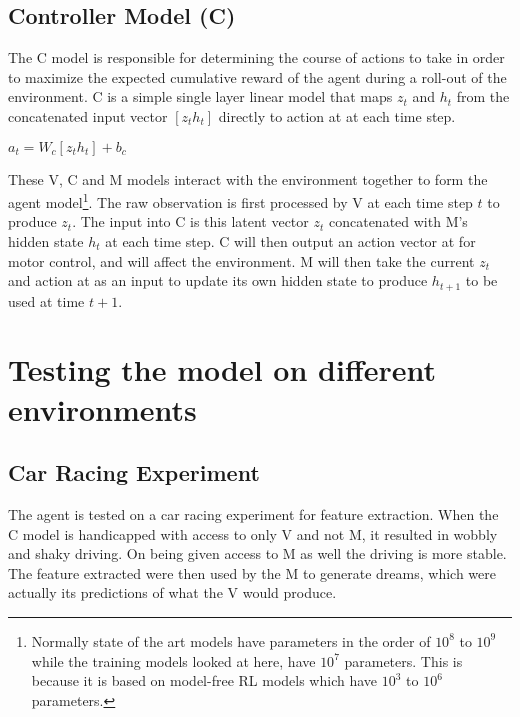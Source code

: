 \documentclass[a4paper]{article}
\begin{document}
\subsection{Controller Model (C)}
The C model is responsible for determining the course of actions to take in order to maximize the expected cumulative reward of the agent during a roll-out of the environment. C is a simple single layer linear model that maps $z_t$ and $h_t$ from the concatenated input vector $[z_t h_t]$ directly to action at at each time step.
\begin{center}
$a_t = W_c[z_t h_t] + b_c$ 
\end{center}
These V, C and M models interact with the environment together to form the agent model\footnote{\label{myfootnote}Normally state of the art models have parameters in the order of $10^8$ to $10^9$ while the training models looked at here, have $10^7$ parameters. This is because it is based on model-free RL models which have $10^3$ to $10^6$ parameters.}. The raw observation is first processed by V at each time step $t$ to produce $z_t$. The input into C is this latent vector $z_t$ concatenated with M’s hidden state $h_t$ at each time step. C will then output an action vector at for motor control, and will affect the environment. M will then take the current $z_t$ and action at as an input to update its own hidden state to produce $h_{t+1}$ to be used at time $t + 1$. 
\newline
\newline
\newline
\newline
\newline
\newline
\newline
\section{Testing the model on different environments}
\subsection{Car Racing Experiment}
The agent is tested on a car racing experiment for feature extraction. When the C model is handicapped with access to only V and not M, it resulted in wobbly and shaky driving. On being given access to M as well the driving is more stable. The feature extracted were then used by the M to generate dreams, which were actually its predictions of what the V would produce.
\end{document}
